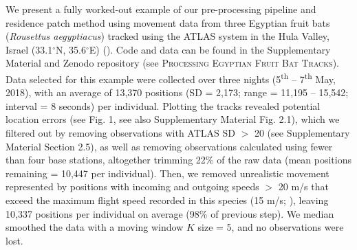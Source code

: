 \begin{refsection}
    We present a fully worked-out example of our pre-processing pipeline and residence patch method using movement data from three Egyptian fruit bats (\textit{Rousettus aegyptiacus}) tracked using the ATLAS system in the Hula Valley, Israel (33.1$^{\circ}$N, 35.6$^{\circ}$E) (\citealt{toledo2020, lourie2021}).
    Code and data can be found in the Supplementary Material and Zenodo repository (see \textsc{Processing Egyptian Fruit Bat Tracks}). 
    Data selected for this example were collected over three nights (5\textsuperscript{th} -- 7\textsuperscript{th} May, 2018), with an average of 13,370 positions (SD = 2,173; range = 11,195 -- 15,542; interval = 8 seconds) per individual.
    Plotting the tracks revealed potential location errors (see Fig. 1, see also Supplementary Material Fig. 2.1), which we filtered out by removing observations with ATLAS SD $>$ 20 (see Supplementary Material Section 2.5), as well as removing observations calculated using fewer than four base stations, altogether trimming 22\% of the raw data (mean positions remaining = 10,447 per individual).
    Then, we removed unrealistic movement represented by positions with incoming and outgoing speeds $>$ 20 m/s that exceed the maximum flight speed recorded in this species (15 m/s; \citealt{tsoar2011}), leaving 10,337 positions per individual on average (98\% of previous step).
    We median smoothed the data with a moving window $K$ size = 5, and no observations were lost.


\end{refsection}
